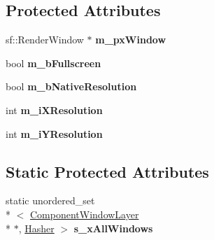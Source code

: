 \subsection*{Protected Attributes}
\begin{DoxyCompactItemize}
\item 
\hypertarget{class_k_g_e_1_1_component_window_layer_a6fbbd4e03bf3ffbe2190e3529665c6af}{sf\-::\-Render\-Window $\ast$ {\bfseries m\-\_\-px\-Window}}\label{class_k_g_e_1_1_component_window_layer_a6fbbd4e03bf3ffbe2190e3529665c6af}

\item 
\hypertarget{class_k_g_e_1_1_component_window_layer_a9ab9cfb60882471333b2bfb7f7065e69}{bool {\bfseries m\-\_\-b\-Fullscreen}}\label{class_k_g_e_1_1_component_window_layer_a9ab9cfb60882471333b2bfb7f7065e69}

\item 
\hypertarget{class_k_g_e_1_1_component_window_layer_ae9814c5fdc41c8020805af4dc0b8b6f9}{bool {\bfseries m\-\_\-b\-Native\-Resolution}}\label{class_k_g_e_1_1_component_window_layer_ae9814c5fdc41c8020805af4dc0b8b6f9}

\item 
\hypertarget{class_k_g_e_1_1_component_window_layer_aa90ae11ee4bb4a9e6b03557d6e78414c}{int {\bfseries m\-\_\-i\-X\-Resolution}}\label{class_k_g_e_1_1_component_window_layer_aa90ae11ee4bb4a9e6b03557d6e78414c}

\item 
\hypertarget{class_k_g_e_1_1_component_window_layer_a2612b10d8401d27e43bf429abb7d51f9}{int {\bfseries m\-\_\-i\-Y\-Resolution}}\label{class_k_g_e_1_1_component_window_layer_a2612b10d8401d27e43bf429abb7d51f9}

\end{DoxyCompactItemize}
\subsection*{Static Protected Attributes}
\begin{DoxyCompactItemize}
\item 
\hypertarget{class_k_g_e_1_1_component_window_layer_a03c90d11942ce14f555bae76356a560b}{static unordered\-\_\-set\\*
$<$ \hyperlink{class_k_g_e_1_1_component_window_layer}{Component\-Window\-Layer} \\*
$\ast$, \hyperlink{struct_k_g_e_1_1_component_window_layer_1_1_hasher}{Hasher} $>$ {\bfseries s\-\_\-x\-All\-Windows}}\label{class_k_g_e_1_1_component_window_layer_a03c90d11942ce14f555bae76356a560b}

\end{DoxyCompactItemize}
